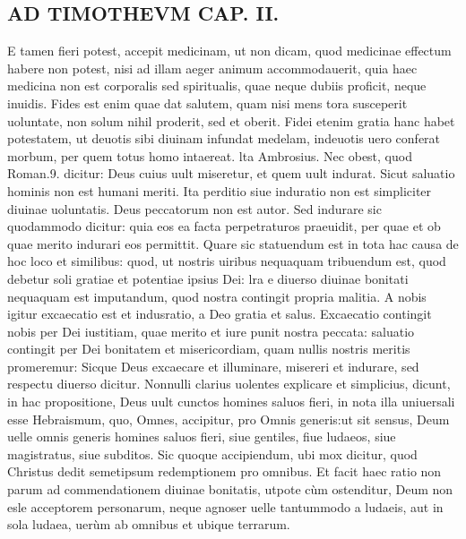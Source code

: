 \documentclass{article}
\begin{document}
\begin{pages}
\section*{AD TIMOTHEVM CAP. II. }
\marginpar{[ p.67 ]}\pstart E tamen fieri potest, accepit medicinam, ut non dicam, quod medicinae effectum habere non potest, nisi ad illam aeger animum accommodauerit, quia haec medicina non est corporalis sed spiritualis, quae neque dubiis proficit, neque inuidis. Fides est enim quae dat salutem, quam nisi mens tora susceperit uoluntate, non solum nihil proderit, sed et oberit. Fidei etenim gratia hanc habet potestatem, ut deuotis sibi diuinam infundat medelam, indeuotis uero conferat morbum, per quem totus homo intaereat. lta Ambrosius. Nec obest, quod Roman.9. dicitur: Deus cuius uult miseretur, et quem uult indurat. Sicut saluatio hominis non est humani meriti. Ita perditio siue induratio non est simpliciter diuinae uoluntatis. Deus peccatorum non est autor. Sed indurare sic quodammodo dicitur: quia eos ea facta perpetraturos praeuidit, per quae et ob quae merito indurari eos permittit. Quare sic statuendum est in tota hac causa de hoc loco et similibus: quod, ut nostris uiribus nequaquam tribuendum est, quod debetur soli gratiae et potentiae ipsius Dei: lra e diuerso diuinae bonitati nequaquam est imputandum, quod nostra contingit propria malitia. A nobis igitur excaecatio est et indusratio, a Deo gratia et salus. Excaecatio contingit nobis per Dei iustitiam, quae merito et iure punit nostra peccata: saluatio contingit per Dei bonitatem et misericordiam, quam nullis nostris meritis promeremur: Sicque  Deus excaecare et illuminare, misereri et indurare, sed respectu diuerso dicitur. Nonnulli clarius uolentes explicare et simplicius, dicunt, in hac propositione, Deus uult cunctos homines saluos fieri, in nota illa uniuersali esse Hebraismum, quo, Omnes, accipitur, pro Omnis generis:ut sit sensus, Deum uelle omnis generis homines saluos fieri, siue gentiles, fiue ludaeos, siue magistratus, siue subditos. Sic quoque accipiendum, ubi mox dicitur, quod Christus dedit semetipsum redemptionem pro omnibus. Et facit haec ratio non parum ad commendationem diuinae bonitatis, utpote cùm ostenditur, Deum non esle acceptorem personarum, neque agnoser uelle tantummodo a ludaeis, aut in sola ludaea, uerùm ab omnibus et ubique terrarum.  \pend
{}
{}

\end{pages}
\end{document}
